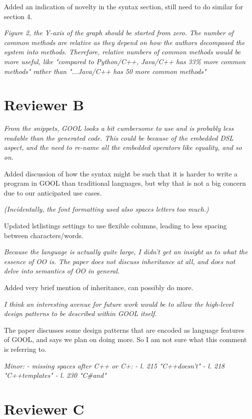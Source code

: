 \documentclass[12pt]{article}
\begin{document}
Added an indication of novelty in the syntax section, still need to do similar 
for section 4.

\textit{Figure 2, the Y-axis of the graph should be started from zero.  The 
number of common methods are relative as they depend on how the authors 
decomposed the system into methods.  Therefore, relative numbers of common 
methods would be more useful, like "compared to Python/C++, Java/C++ has 33\% 
more common methods" rather  than "...Java/C++ has 50 more common methods"}

\section{Reviewer B}

\textit{From the snippets, GOOL looks a bit cumbersome to use and is probably 
less readable than the generated code. This could be because of the embedded 
DSL aspect, and the need to re-name all the embedded operators like equality, 
and so on.}

Added discussion of how the syntax might be such that it is harder to write a 
program in GOOL than traditional languages, but why that is not a big concern 
due to our anticipated use cases.

\textit{(Incidentally, the font formatting used also spaces letters too much.)}

Updated lstlistings settings to use flexible columns, leading to less spacing 
between characters/words.

\textit{Because the language is actually quite large, I didn't get an insight 
as to what the essence of OO is. The paper does not discuss inheritance at all, 
and does not delve into semantics of OO in general.}

Added very brief mention of inheritance, can possibly do more.

\textit{I think an interesting avenue for future work would be to allow the 
high-level design patterns to be described within GOOL itself.}

The paper discusses some design patterns that are encoded as language features 
of GOOL, and says we plan on doing more. So I am not sure what this comment is 
referring to.

\textit{Minor:
	- missing spaces after C++ or C+:
	- l. 215 "C++doesn’t"
	- l. 218 "C++templates"
	- l. 230 "C\#and"}

\section{Reviewer C}
\end{document}
